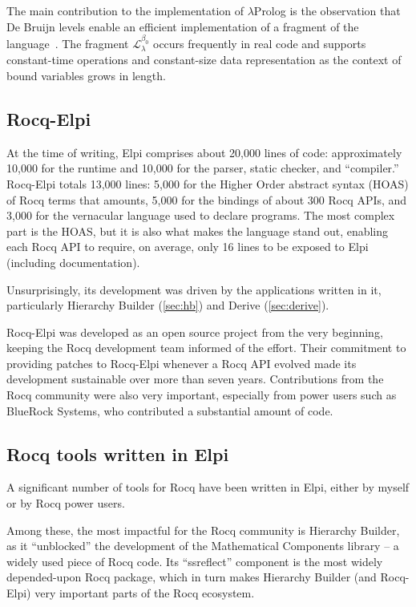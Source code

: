 \documentclass[a4paper, 11pt]{book}
\begin{document}
The main contribution to the implementation of $\lambda$Prolog is the observation that De Bruijn levels enable an efficient implementation of a fragment of the language~\cite{dunchev15lpar}. The fragment $\mathcal{L}_\lambda^{\beta_0}$ occurs frequently in real code and supports constant-time operations and constant-size data representation as the context of bound variables grows in length.

\subsection{Rocq-Elpi}


At the time of writing, Elpi comprises about 20,000 lines of code: approximately 10,000 for the runtime and 10,000 for the parser, static checker, and ``compiler.'' Rocq-Elpi totals 13,000 lines: 5,000 for the Higher Order abstract syntax (HOAS) of Rocq terms that amounts, 5,000 for the bindings of about 300 Rocq APIs, and 3,000 for the vernacular language used to declare programs. The most complex part is the HOAS, but it is also what makes the language stand out, enabling each Rocq API to require, on average, only 16 lines to be exposed to Elpi (including documentation).

Unsurprisingly, its development was driven by the applications written in it, particularly Hierarchy Builder (\cref{sec:hb}) and Derive (\cref{sec:derive}).

Rocq-Elpi was developed as an open source project from the very beginning, keeping the Rocq development team informed of the effort. Their commitment to providing patches to Rocq-Elpi whenever a Rocq API evolved made its development sustainable over more than seven years. Contributions from the Rocq community were also very important, especially from power users such as BlueRock Systems, who contributed a substantial amount of code.

\subsection{Rocq tools written in Elpi}

A significant number of tools for Rocq have been written in Elpi, either by myself or by Rocq power users.

Among these, the most impactful for the Rocq community is Hierarchy Builder, as it ``unblocked'' the development of the Mathematical Components library -- a widely used piece of Rocq code. Its ``ssreflect'' component is the most widely depended-upon Rocq package, which in turn makes Hierarchy Builder (and Rocq-Elpi) very important parts of the Rocq ecosystem.
\end{document}
